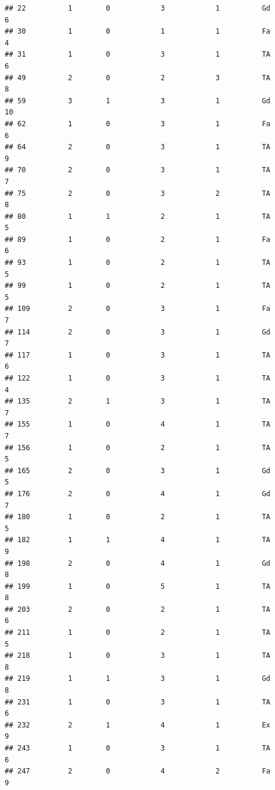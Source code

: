 \documentclass[]{article}
\begin{document}
\begin{verbatim}
## 22          1        0            3            1          Gd            6
## 30          1        0            1            1          Fa            4
## 31          1        0            3            1          TA            6
## 49          2        0            2            3          TA            8
## 59          3        1            3            1          Gd           10
## 62          1        0            3            1          Fa            6
## 64          2        0            3            1          TA            9
## 70          2        0            3            1          TA            7
## 75          2        0            3            2          TA            8
## 80          1        1            2            1          TA            5
## 89          1        0            2            1          Fa            6
## 93          1        0            2            1          TA            5
## 99          1        0            2            1          TA            5
## 109         2        0            3            1          Fa            7
## 114         2        0            3            1          Gd            7
## 117         1        0            3            1          TA            6
## 122         1        0            3            1          TA            4
## 135         2        1            3            1          TA            7
## 155         1        0            4            1          TA            7
## 156         1        0            2            1          TA            5
## 165         2        0            3            1          Gd            5
## 176         2        0            4            1          Gd            7
## 180         1        0            2            1          TA            5
## 182         1        1            4            1          TA            9
## 198         2        0            4            1          Gd            8
## 199         1        0            5            1          TA            8
## 203         2        0            2            1          TA            6
## 211         1        0            2            1          TA            5
## 218         1        0            3            1          TA            8
## 219         1        1            3            1          Gd            8
## 231         1        0            3            1          TA            6
## 232         2        1            4            1          Ex            9
## 243         1        0            3            1          TA            6
## 247         2        0            4            2          Fa            9

\end{verbatim}
\end{document}
